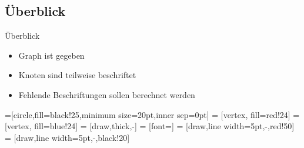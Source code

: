 \subsection{Überblick}
\begin{frame}{Überblick}
    \begin{itemize}
        \item Graph ist gegeben
        \item Knoten sind teilweise beschriftet
        \item Fehlende Beschriftungen sollen berechnet werden
    \end{itemize}

\end{frame}


=[circle,fill=black!25,minimum size=20pt,inner sep=0pt]
 = [vertex, fill=red!24]
 = [vertex, fill=blue!24]
 = [draw,thick,-]
 = [font=\small]
 = [draw,line width=5pt,-,red!50]
 = [draw,line width=5pt,-,black!20]

